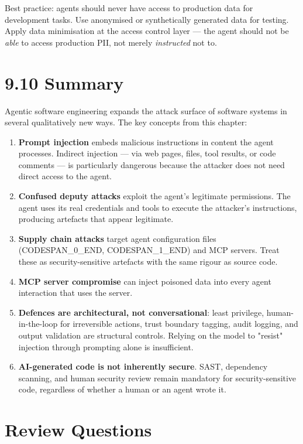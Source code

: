 \documentclass[11pt,a4paper]{book}
\begin{document}
Best practice: agents should never have access to production data for development tasks. Use anonymised or synthetically generated data for testing. Apply data minimisation at the access control layer --- the agent should not be \textit{able} to access production PII, not merely \textit{instructed} not to.

\medskip

\section{9.10 Summary}

Agentic software engineering expands the attack surface of software systems in several qualitatively new ways. The key concepts from this chapter:

\begin{enumerate}
  \item \textbf{Prompt injection} embeds malicious instructions in content the agent processes. Indirect injection --- via web pages, files, tool results, or code comments --- is particularly dangerous because the attacker does not need direct access to the agent.
  \item \textbf{Confused deputy attacks} exploit the agent's legitimate permissions. The agent uses its real credentials and tools to execute the attacker's instructions, producing artefacts that appear legitimate.
  \item \textbf{Supply chain attacks} target agent configuration files (CODESPAN\_0\_END, CODESPAN\_1\_END) and MCP servers. Treat these as security-sensitive artefacts with the same rigour as source code.
  \item \textbf{MCP server compromise} can inject poisoned data into every agent interaction that uses the server.
  \item \textbf{Defences are architectural, not conversational}: least privilege, human-in-the-loop for irreversible actions, trust boundary tagging, audit logging, and output validation are structural controls. Relying on the model to "resist" injection through prompting alone is insufficient.
  \item \textbf{AI-generated code is not inherently secure}. SAST, dependency scanning, and human security review remain mandatory for security-sensitive code, regardless of whether a human or an agent wrote it.
\end{enumerate}

\medskip

\section{Review Questions}
\end{document}
